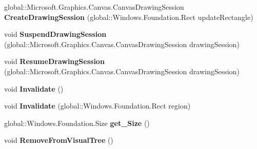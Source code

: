 \begin{DoxyCompactItemize}
global\+::\+Microsoft.\+Graphics.\+Canvas.\+Canvas\+Drawing\+Session {\bfseries Create\+Drawing\+Session} (global\+::\+Windows.\+Foundation.\+Rect update\+Rectangle)
\item 
\mbox{\label{interface_microsoft_1_1_graphics_1_1_canvas_1_1_u_i_1_1_xaml_1_1_i_canvas_virtual_control_a863b7d9556ff253f2f17ac57251ccd59}} 
void {\bfseries Suspend\+Drawing\+Session} (global\+::\+Microsoft.\+Graphics.\+Canvas.\+Canvas\+Drawing\+Session drawing\+Session)
\item 
\mbox{\label{interface_microsoft_1_1_graphics_1_1_canvas_1_1_u_i_1_1_xaml_1_1_i_canvas_virtual_control_a7e6d0d2eb3d02dc319be796419d0cfe9}} 
void {\bfseries Resume\+Drawing\+Session} (global\+::\+Microsoft.\+Graphics.\+Canvas.\+Canvas\+Drawing\+Session drawing\+Session)
\item 
\mbox{\label{interface_microsoft_1_1_graphics_1_1_canvas_1_1_u_i_1_1_xaml_1_1_i_canvas_virtual_control_a1be93b3a5d0e3dcaf003f823744a742a}} 
void {\bfseries Invalidate} ()
\item 
\mbox{\label{interface_microsoft_1_1_graphics_1_1_canvas_1_1_u_i_1_1_xaml_1_1_i_canvas_virtual_control_a62871b6e73475af85360a54cae8c5b8c}} 
void {\bfseries Invalidate} (global\+::\+Windows.\+Foundation.\+Rect region)
\item 
\mbox{\label{interface_microsoft_1_1_graphics_1_1_canvas_1_1_u_i_1_1_xaml_1_1_i_canvas_virtual_control_a492d1764aec8156722e9f3a77be1e6e4}} 
global\+::\+Windows.\+Foundation.\+Size {\bfseries get\+\_\+\+Size} ()
\item 
\mbox{\label{interface_microsoft_1_1_graphics_1_1_canvas_1_1_u_i_1_1_xaml_1_1_i_canvas_virtual_control_a179cc5aea8c0c39208af30d39fc93d7e}} 
void {\bfseries Remove\+From\+Visual\+Tree} ()
\item 

\end{DoxyCompactItemize}
